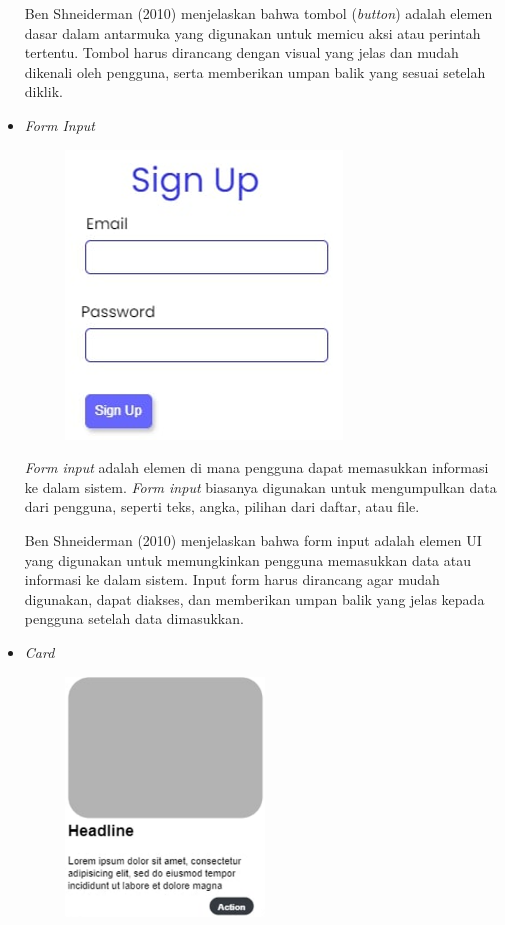 \documentclass[12pt]{article}
\begin{document}
\begin{itemize}
\par Ben Shneiderman (2010) menjelaskan bahwa tombol (\emph{button}) adalah elemen dasar dalam antarmuka yang digunakan untuk memicu aksi atau perintah tertentu. Tombol harus dirancang dengan visual yang jelas dan mudah dikenali oleh pengguna, serta memberikan umpan balik yang sesuai setelah diklik.

\item \emph{Form Input} 

\begin{figure}
    \centering
    \includegraphics[width=0.5\linewidth]{asset/form.png}
\end{figure}

\par \emph{Form input} adalah elemen di mana pengguna dapat memasukkan informasi ke dalam sistem. \emph{Form input} biasanya digunakan untuk mengumpulkan data dari pengguna, seperti teks, angka, pilihan dari daftar, atau file.

\par Ben Shneiderman (2010) menjelaskan bahwa form input adalah elemen UI yang digunakan untuk memungkinkan pengguna memasukkan data atau informasi ke dalam sistem. Input form harus dirancang agar mudah digunakan, dapat diakses, dan memberikan umpan balik yang jelas kepada pengguna setelah data dimasukkan.

 \item \emph{Card}

 \begin{figure}[h] %
    \centering
    \includegraphics[width=0.5\textwidth]{asset/card.png}
\end{figure}


\end{itemize}
\end{document}
